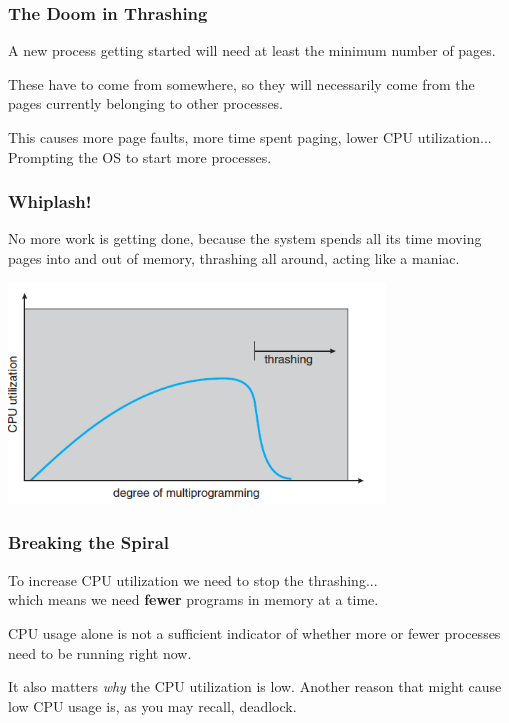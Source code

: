 \begin{frame}
\frametitle{The Doom in Thrashing}

A new process getting started will need at least the minimum number of pages. 

These have to come from somewhere, so they will necessarily come from the pages currently belonging to other processes. 

This causes more page faults, more time spent paging, lower CPU utilization...\\
\quad Prompting the OS to start more processes. 
\end{frame}

\begin{frame}
\frametitle{Whiplash!}

No more work is getting done, because the system spends all its time moving pages into and out of memory, thrashing all around, acting like a maniac.

\begin{center}
\includegraphics[width=0.75\textwidth]{images/thrashing.png}
\end{center}

\end{frame}

\begin{frame}
\frametitle{Breaking the Spiral}

To increase CPU utilization we need to stop the thrashing...\\
\quad which means we need \textbf{fewer} programs in memory at a time. 

CPU usage alone is not a sufficient indicator of whether more or fewer processes need to be running right now. 

It also matters \textit{why} the CPU utilization is low. Another reason that might cause low CPU usage is, as you may recall, deadlock. 


\end{frame}

